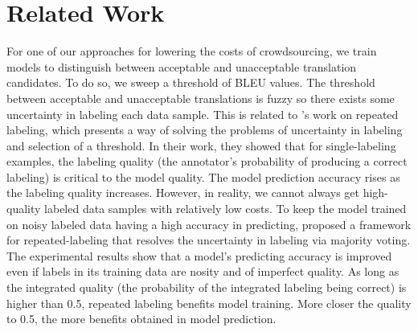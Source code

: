 \documentclass[11pt]{article}
\begin{document}
\section{Related Work}

For one of our approaches for lowering the costs of crowdsourcing,  we train models to distinguish between acceptable and unacceptable translation candidates.  To do so,
we sweep a threshold of BLEU values. The threshold between acceptable and unacceptable translations is fuzzy so there exists some uncertainty in labeling each data sample.  This is related to \cite{sheng2008get}'s work on repeated labeling, which presents a way of solving the problems of   uncertainty in labeling and selection of a threshold. In their work, they showed that for single-labeling examples, the labeling quality (the annotator's probability of producing a correct labeling) is critical to the model quality. The model prediction accuracy rises as the labeling quality increases. However, in reality, we cannot always get high-quality labeled data samples with relatively low costs. To keep the model trained on noisy labeled data having a high accuracy in predicting,  proposed a framework for repeated-labeling that resolves the uncertainty in labeling via majority voting.  
The experimental results show that a model's predicting accuracy is improved even if labels in its training data are nosity and of imperfect quality.  As long as the integrated quality (the probability of the integrated labeling being correct) is higher than 0.5, repeated labeling benefits model training. More closer the quality to 0.5, the more benefits obtained in model prediction.


\end{document}
